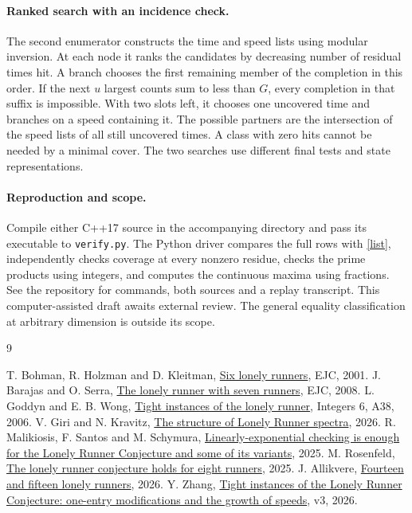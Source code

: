 \documentclass[11pt,a4paper]{article}
\begin{document}
\paragraph{Ranked search with an incidence check.}
The second enumerator constructs the time and speed lists using modular
inversion. At each node it ranks the candidates by decreasing number of
residual times hit. A branch chooses the first remaining member of the
completion in this order. If the next $u$ largest counts sum to less than
$G$, every completion in that suffix is impossible. With two slots left,
it chooses one uncovered time and branches on a speed containing it.
The possible partners are the intersection of the speed lists of all
still uncovered times. A class with zero hits cannot be needed by a
minimal cover. The two searches use different final tests and state
representations.

\paragraph{Reproduction and scope.}
Compile either C++17 source in the accompanying directory and pass its
executable to \texttt{verify.py}. The Python driver compares the full rows
with \eqref{list}, independently checks coverage at every nonzero residue,
checks the prime products using integers, and computes the continuous
maxima using fractions. See the repository for commands, both sources and
a replay transcript. This computer-assisted draft awaits external review.
The general equality classification at arbitrary dimension is outside its
scope.

\begin{thebibliography}{9}\small\raggedright
{} T. Bohman, R. Holzman and D. Kleitman,
\href{https://doi.org/10.37236/1602}{Six lonely runners}, EJC, 2001.
 J. Barajas and O. Serra,
\href{https://arxiv.org/abs/0710.4495}{The lonely runner with seven runners}, EJC, 2008.
 L. Goddyn and E. B. Wong,
\href{https://zenodo.org/records/8275490}{Tight instances of the lonely runner}, Integers 6, A38, 2006.
 V. Giri and N. Kravitz,
\href{https://doi.org/10.1017/S0305004125101497}{The structure of Lonely Runner spectra}, 2026.
 R. Malikiosis, F. Santos and M. Schymura,
\href{https://doi.org/10.1017/fms.2025.10107}{Linearly-exponential checking is enough for the Lonely Runner Conjecture and some of its variants}, 2025.
 M. Rosenfeld,
\href{https://arxiv.org/abs/2509.14111}{The lonely runner conjecture holds for eight runners}, 2025.
 J. Allikvere,
\href{https://arxiv.org/abs/2609.02604}{Fourteen and fifteen lonely runners}, 2026.
 Y. Zhang,
\href{https://arxiv.org/abs/2608.13599}{Tight instances of the Lonely Runner Conjecture: one-entry modifications and the growth of speeds}, v3, 2026.
\end{thebibliography}
\end{document}
